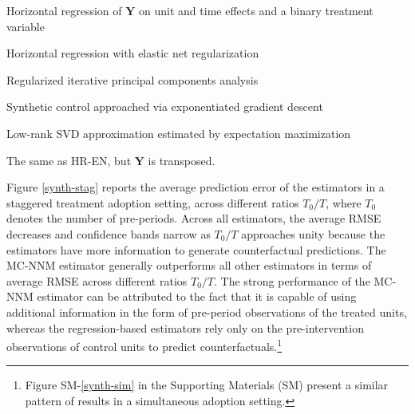 \documentclass[12pt]{article}
\begin{document}
\begin{description}
	{\setlength\itemindent{1mm}
		\item[DID] Horizontal regression of $\mathbf{Y}$ on unit and time effects and a binary treatment variable \citep{athey2017matrix}
		\item[HR-EN] Horizontal regression with elastic net regularization \citep{athey2017matrix} 
		\item[PCA] Regularized iterative principal components analysis \citep{ilin2010practical}
		\item[SC-ADH] Synthetic control approached via exponentiated gradient descent \citep{abadie2010synthetic}
		\item[SVD] Low-rank SVD approximation estimated by expectation maximization \citep{troyanskaya2001missing}
		\item[VT-EN] The same as HR-EN, but $\mathbf{Y}$ is transposed.
	}
\end{description}

Figure \ref{synth-stag} reports the average prediction error of the estimators in a staggered treatment adoption setting, across different ratios $T_0/T$, where $T_0$ denotes the number of pre-periods. Across all estimators, the average RMSE decreases and confidence bands narrow as $T_0/T$ approaches unity because the estimators have more information to generate counterfactual predictions. The MC-NNM estimator generally outperforms all other estimators in terms of average RMSE across different ratios $T_0/T$.  The strong performance of the MC-NNM estimator can be attributed to the fact that it is capable of using additional information in the form of pre-period observations of the treated units, whereas the regression-based estimators rely only on the pre-intervention observations of control units to predict counterfactuals.\footnote{Figure SM-\ref{synth-sim} in the Supporting Materials (SM) present a similar pattern of results in a simultaneous adoption setting.}
\end{document}
